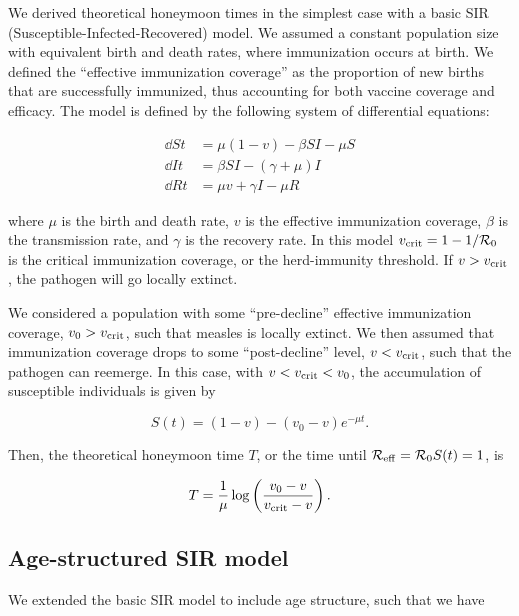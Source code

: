 We derived theoretical honeymoon times in the simplest case with a basic SIR (Susceptible-Infected-Recovered) model. We assumed a constant population size with equivalent birth and death rates, where immunization occurs at birth. We defined the ``effective immunization coverage'' as the proportion of new births that are successfully immunized, thus accounting for both vaccine coverage and efficacy. The model is defined by the following system of differential equations:

\begin{align}
\dd{S}{t} &= \mu (1-v)-\beta SI-\mu S \\ 
\dd{I}{t} &= \beta SI-(\gamma+\mu)I \\ 
\dd{R}{t} &= \mu v+\gamma I-\mu R
\label{eq:sir-main-methods}
\end{align}

\noindent
where $\mu$ is the birth and death rate, $v$ is the effective immunization coverage, $\beta$ is the transmission rate, and $\gamma$ is the recovery rate. In this model $v_{\mathrm{crit}} = 1-1/\mathcal{R}_{0}$ is the critical immunization coverage, or the herd-immunity threshold. If $v>v_{\mathrm{crit}}$, the pathogen will go locally extinct. 

We considered a population with some ``pre-decline'' effective immunization coverage, $v_0 > v_{\mathrm{crit}}$, such that measles is locally extinct. We then assumed that immunization coverage drops to some ``post-decline'' level, $v < v_{\mathrm{crit}}$, such that the pathogen can reemerge. In this case, with $v < v_{\mathrm{crit}} < v_0$, the accumulation of susceptible individuals is given by

\begin{equation}
S(t)=(1-v)-(v_0-v)e^{-\mu t}.
\label{eq:susceptible-main-methods}
\end{equation}

\noindent
Then, the theoretical honeymoon time $T$, or the time until $\mathcal{R}_{\mathrm{eff}}=\mathcal{R}_{0} S(t)=1$, is 

\begin{equation}
T  = \frac{1}{\mu} \log\left(\frac{v_0-v}{v_{\mathrm{crit}}-v}\right).
\label{eq:honeymoon-time-methods}
\end{equation}

\subsection{Age-structured SIR model}
\label{sec:methods-age-structured}

We extended the basic SIR model to include age structure, such that we have

